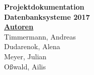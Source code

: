 \documentclass[a4paper ,8pt,x11names]{article}
\begin{document}
\begin{center}
\Huge{\textbf{Projektdokumentation}}\\
\Large{\textbf{Datenbanksysteme 2017}}\\
\normalsize
\vspace{4cm}
\underline{\textbf{Autoren}}\\
Timmermann, Andreas\\
Dudarenok, Alena\\
Meyer, Julian\\
O\ss wald, Ailis\\
\normalsize
\end{center}
\newpage
\end{document}
